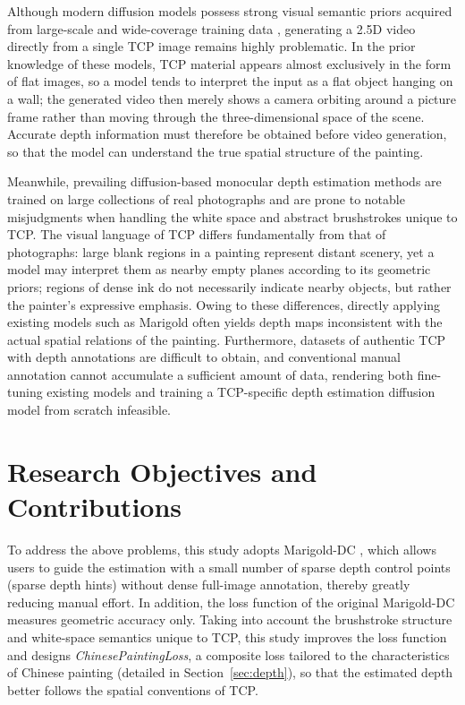 Although modern diffusion models possess strong visual semantic priors
acquired from large-scale and wide-coverage training data \cite{LAION-5B},
generating a 2.5D video directly from a single TCP image remains highly problematic.
In the prior knowledge of these models, TCP material appears almost exclusively in the form of flat images,
so a model tends to interpret the input as a flat object hanging on a wall;
the generated video then merely shows a camera orbiting around a picture frame
rather than moving through the three-dimensional space of the scene.
Accurate depth information must therefore be obtained before video generation,
so that the model can understand the true spatial structure of the painting.

Meanwhile, prevailing diffusion-based monocular depth estimation methods are trained on
large collections of real photographs and are prone to notable misjudgments
when handling the white space and abstract brushstrokes unique to TCP.
The visual language of TCP differs fundamentally from that of photographs:
large blank regions in a painting represent distant scenery,
yet a model may interpret them as nearby empty planes according to its geometric priors;
regions of dense ink do not necessarily indicate nearby objects,
but rather the painter's expressive emphasis.
Owing to these differences, directly applying existing models such as Marigold \cite{marigold}
often yields depth maps inconsistent with the actual spatial relations of the painting.
Furthermore, datasets of authentic TCP with depth annotations are difficult to obtain,
and conventional manual annotation cannot accumulate a sufficient amount of data,
rendering both fine-tuning existing models and training a TCP-specific depth estimation
diffusion model from scratch infeasible.

\section{Research Objectives and Contributions}

To address the above problems, this study adopts Marigold-DC \cite{marigolddc},
which allows users to guide the estimation with a small number of sparse depth control points (sparse depth hints)
without dense full-image annotation, thereby greatly reducing manual effort.
In addition, the loss function of the original Marigold-DC measures geometric accuracy only.
Taking into account the brushstroke structure and white-space semantics unique to TCP,
this study improves the loss function and designs \textit{ChinesePaintingLoss},
a composite loss tailored to the characteristics of Chinese painting (detailed in Section~\ref{sec:depth}),
so that the estimated depth better follows the spatial conventions of TCP.

